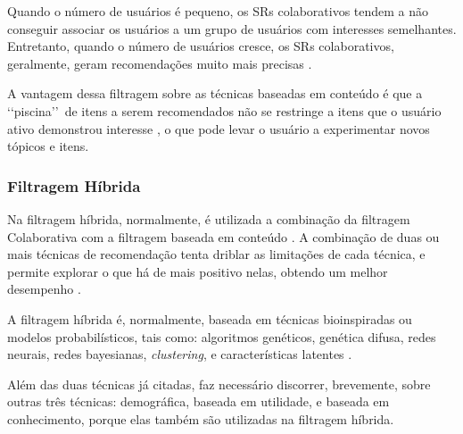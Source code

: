 Quando o número de usuários é pequeno, os SRs colaborativos tendem a não conseguir associar 
os usuários a um grupo de usuários com interesses semelhantes. Entretanto, quando o 
número de usuários cresce, os SRs colaborativos, geralmente, geram recomendações muito mais 
precisas \cite{mauricio}. 

A vantagem dessa filtragem sobre as técnicas baseadas em conteúdo é que a \lq\lq piscina\rq\rq\  de itens a serem recomendados 
não se restringe a itens que o usuário ativo demonstrou interesse \cite{paulson2003}, o que pode levar o usuário a experimentar novos tópicos e itens.


\subsubsection{Filtragem Híbrida}

Na filtragem híbrida, normalmente, é utilizada a combinação da filtragem Colaborativa com a filtragem 
baseada em conteúdo \cite{bobadilla2013}. A combinação de duas ou mais técnicas de recomendação tenta driblar as limitações de cada 
técnica, e permite explorar o que há de mais positivo nelas, obtendo um melhor desempenho \cite{burke2002}. 

A filtragem híbrida é, normalmente, baseada em técnicas bioinspiradas ou modelos probabilísticos, tais como: 
algoritmos genéticos, genética difusa, redes neurais, redes bayesianas, \emph{clustering}, e características latentes  \cite{bobadilla2013}.

Além das duas técnicas já citadas, faz necessário discorrer, brevemente, sobre outras três técnicas: demográfica, baseada em utilidade, 
e baseada em conhecimento, porque 
elas também são utilizadas na filtragem híbrida.

